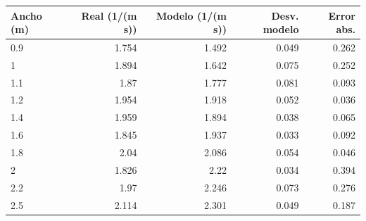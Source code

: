 \begin{tabular}{lrrrr}
\toprule
Ancho (m) & Real (1/(m s)) & Modelo (1/(m s)) & Desv. modelo & Error abs. \\
\midrule
0.9 & 1.754 & 1.492 & 0.049 & 0.262 \\
1 & 1.894 & 1.642 & 0.075 & 0.252 \\
1.1 & 1.87 & 1.777 & 0.081 & 0.093 \\
1.2 & 1.954 & 1.918 & 0.052 & 0.036 \\
1.4 & 1.959 & 1.894 & 0.038 & 0.065 \\
1.6 & 1.845 & 1.937 & 0.033 & 0.092 \\
1.8 & 2.04 & 2.086 & 0.054 & 0.046 \\
2 & 1.826 & 2.22 & 0.034 & 0.394 \\
2.2 & 1.97 & 2.246 & 0.073 & 0.276 \\
2.5 & 2.114 & 2.301 & 0.049 & 0.187 \\
\bottomrule
\end{tabular}
